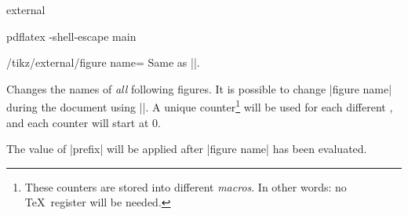 {\begin{pgfplotslibrary}{external}
\begin{command}{}
\begin{codeexample}

\end{codeexample}
\begin{codeexample}
pdflatex -shell-escape main
\end{codeexample}
\end{command}

\begin{key}{/tikz/external/figure name=}
	Same as ||.
\end{key}
\begin{command}{}
	Changes the names of \emph{all} following figures. It is possible to change |figure name| during the document using ||. A unique counter\footnote{These counters are stored into different \emph{macros}. In other words: no \TeX\ register will be needed.} will be used for each different , and each counter will start at $0$.

	The value of |prefix| will be applied after |figure name| has been evaluated.
\end{command}
\end{pgfplotslibrary}}
